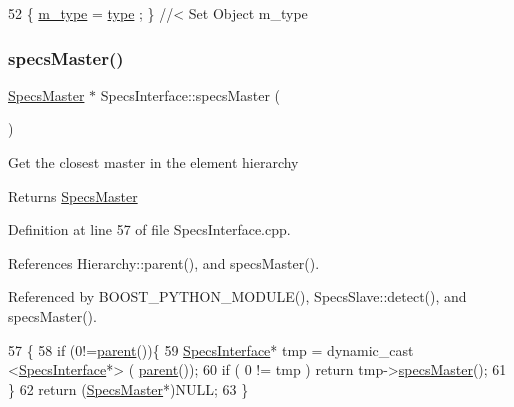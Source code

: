 \begin{DoxyCode}
52 \{ \hyperlink{classObject_a457a600fe8c00eb1034374f75110a78c}{m\_type}  = \hyperlink{classObject_a84f99f70f144a83e1582d1d0f84e4e62}{type}  ; \} \textcolor{comment}{//< Set Object m\_type}
\end{DoxyCode}
\mbox{\label{classSpecsInterface_a3d497c965fb6ec06b49a54b7901a22b2}} 
\subsubsection{\texorpdfstring{specs\+Master()}{specsMaster()}}
{\footnotesize\ttfamily \hyperlink{classSpecsMaster}{Specs\+Master} $\ast$ Specs\+Interface\+::specs\+Master (\begin{DoxyParamCaption}{ }\end{DoxyParamCaption})\hspace{0.3cm}{\ttfamily [virtual]}}

Get the closest master in the element hierarchy \begin{DoxyReturn}{Returns}
\hyperlink{classSpecsMaster}{Specs\+Master} 
\end{DoxyReturn}


Definition at line 57 of file Specs\+Interface.\+cpp.



References Hierarchy\+::parent(), and specs\+Master().



Referenced by B\+O\+O\+S\+T\+\_\+\+P\+Y\+T\+H\+O\+N\+\_\+\+M\+O\+D\+U\+L\+E(), Specs\+Slave\+::detect(), and specs\+Master().


\begin{DoxyCode}
57                                         \{
58     \textcolor{keywordflow}{if} (0!=\hyperlink{classHierarchy_a1c7bec8257e717f9c1465e06ebf845fc}{parent}())\{
59     \hyperlink{classSpecsInterface}{SpecsInterface}* tmp = dynamic\_cast <\hyperlink{classSpecsInterface}{SpecsInterface}*> (
      \hyperlink{classHierarchy_a1c7bec8257e717f9c1465e06ebf845fc}{parent}());
60     \textcolor{keywordflow}{if} ( 0 != tmp ) \textcolor{keywordflow}{return} tmp->\hyperlink{classSpecsInterface_a3d497c965fb6ec06b49a54b7901a22b2}{specsMaster}();
61   \}
62   \textcolor{keywordflow}{return} (\hyperlink{classSpecsMaster}{SpecsMaster}*)NULL;
63 \}
\end{DoxyCode}
\mbox{\label{classSpecsInterface_aa8aeaa74acf2c913905ea996d153a6ef}} 
